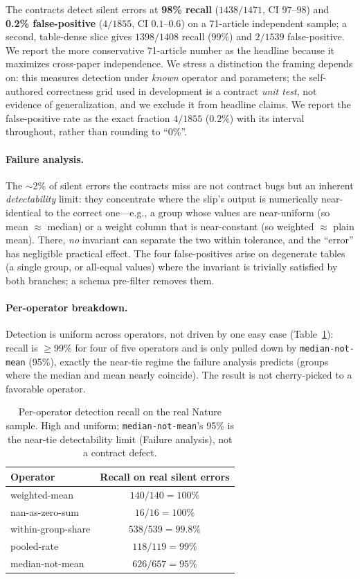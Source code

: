 \documentclass[10pt,twocolumn,letterpaper]{article}
\begin{document}
The contracts detect silent errors at \textbf{98\% recall} ($1438/1471$, CI
$97$--$98$) and \textbf{0.2\% false-positive} ($4/1855$, CI $0.1$--$0.6$) on a
71-article independent sample; a second, table-dense slice gives $1398/1408$
recall ($99\%$) and $2/1539$ false-positive. We report the more conservative
71-article number as the headline because it maximizes cross-paper independence.
We stress a distinction the framing depends on: this measures detection under
\emph{known} operator and parameters; the self-authored correctness grid used in
development is a contract \emph{unit test}, not evidence of generalization, and
we exclude it from headline claims. We report the false-positive rate as the
exact fraction $4/1855$ ($0.2\%$) with its interval throughout, rather than
rounding to ``0\%''.

\paragraph{Failure analysis.} The $\sim$2\% of silent errors the contracts miss
are not contract bugs but an inherent \emph{detectability} limit: they
concentrate where the slip's output is numerically near-identical to the correct
one---e.g., a group whose values are near-uniform (so mean $\approx$ median) or a
weight column that is near-constant (so weighted $\approx$ plain mean). There,
\emph{no} invariant can separate the two within tolerance, and the ``error''
has negligible practical effect. The four false-positives arise on degenerate
tables (a single group, or all-equal values) where the invariant is trivially
satisfied by both branches; a schema pre-filter removes them.

\paragraph{Per-operator breakdown.} Detection is uniform across operators, not
driven by one easy case (Table~\ref{tab:perop}): recall is $\geq$99\% for four of
five operators and is only pulled down by \texttt{median-not-mean} (95\%),
exactly the near-tie regime the failure analysis predicts (groups where the
median and mean nearly coincide). The result is not cherry-picked to a
favorable operator.

\begin{table}[t]\centering\small
\begin{tabular}{@{}lc@{}}
\toprule
Operator & Recall on real silent errors\\
\midrule
weighted-mean & $140/140 = 100\%$\\
nan-as-zero-sum & $16/16 = 100\%$\\
within-group-share & $538/539 = 99.8\%$\\
pooled-rate & $118/119 = 99\%$\\
median-not-mean & $626/657 = 95\%$\\
\bottomrule
\end{tabular}
\caption{Per-operator detection recall on the real Nature sample. High and
uniform; \texttt{median-not-mean}'s 95\% is the near-tie detectability limit
(Failure analysis), not a contract defect.}
\label{tab:perop}
\end{table}
\end{document}
